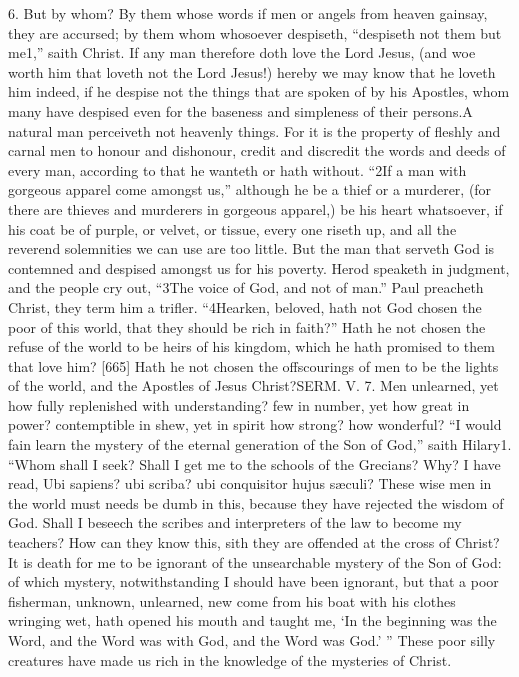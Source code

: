 6. But by whom? By them whose words if men or angels from heaven gainsay, they are accursed; by them whom whosoever despiseth, “despiseth not them but me1,” saith Christ. If any man therefore doth love the Lord Jesus, (and woe worth him that loveth not the Lord Jesus!) hereby we may know that he loveth him indeed, if he despise not the things that are spoken of by his Apostles, whom many have despised even for the baseness and simpleness of their persons.A natural man perceiveth not heavenly things. For it is the property of fleshly and carnal men to honour and dishonour, credit and discredit the words and deeds of every man, according to that he wanteth or hath without. “2If a man with gorgeous apparel come amongst us,” although he be a thief or a murderer, (for there are thieves and murderers in gorgeous apparel,) be his heart whatsoever, if his coat be of purple, or velvet, or tissue, every one riseth up, and all the reverend solemnities we can use are too little. But the man that serveth God is contemned and despised amongst us for his poverty. Herod speaketh in judgment, and the people cry out, “3The voice of God, and not of man.” Paul preacheth Christ, they term him a trifler. “4Hearken, beloved, hath not God chosen the poor of this world, that they should be rich in faith?” Hath he not chosen the refuse of the world to be heirs of his kingdom, which he hath promised to them that love him? [665] Hath he not chosen the offscourings of men to be the lights of the world, and the Apostles of Jesus Christ?SERM. V. 7. Men unlearned, yet how fully replenished with understanding? few in number, yet how great in power? contemptible in shew, yet in spirit how strong? how wonderful? “I would fain learn the mystery of the eternal generation of the Son of God,” saith Hilary1. “Whom shall I seek? Shall I get me to the schools of the Grecians? Why? I have read, Ubi sapiens? ubi scriba? ubi conquisitor hujus sæculi? These wise men in the world must needs be dumb in this, because they have rejected the wisdom of God. Shall I beseech the scribes and interpreters of the law to become my teachers? How can they know this, sith they are offended at the cross of Christ? It is death for me to be ignorant of the unsearchable mystery of the Son of God: of which mystery, notwithstanding I should have been ignorant, but that a poor fisherman, unknown, unlearned, new come from his boat with his clothes wringing wet, hath opened his mouth and taught me, ‘In the beginning was the Word, and the Word was with God, and the Word was God.’ ” These poor silly creatures have made us rich in the knowledge of the mysteries of Christ.

